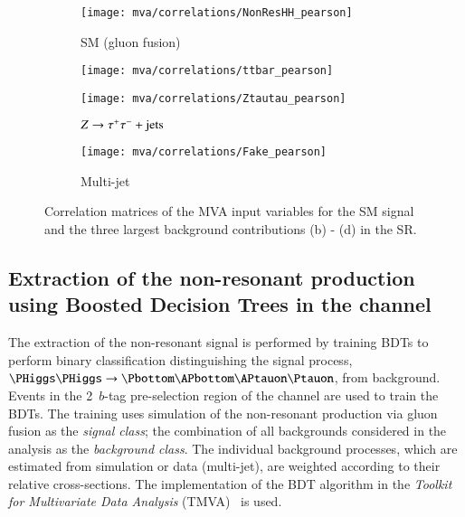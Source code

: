 \begin{figure}[htbp]
  \centering

  \begin{subfigure}[t]{.49\textwidth}
    \texttt{[image: mva/correlations/NonResHH\_pearson]}
    \caption{SM \HH (gluon fusion)}
  \end{subfigure}\hfill %
  \begin{subfigure}[t]{.49\textwidth}
    \texttt{[image: mva/correlations/ttbar\_pearson]}
    \caption{\ttbar}
  \end{subfigure}

  \begin{subfigure}[t]{.49\textwidth}
    \texttt{[image: mva/correlations/Ztautau\_pearson]}
    \caption{$Z \rightarrow \tau^{+} \tau^{-} + \text{jets}$}
  \end{subfigure}\hfill %
  \begin{subfigure}[t]{.49\textwidth}
    \texttt{[image: mva/correlations/Fake\_pearson]}
    \caption{Multi-jet}
  \end{subfigure}

  \caption{Correlation matrices of the MVA input variables for the SM
    \HH signal and the three largest background contributions (b) -
    (d) in the \hadhad SR.}
  \label{fig:mva_input_correlations}
\end{figure}


\subsection{Extraction of the non-resonant \HH production using
  Boosted Decision Trees in the \hadhad channel}
\label{sec:mva_smbdt}

The extraction of the non-resonant \HH signal is performed by training
BDTs to perform binary classification distinguishing the signal
process, $\HH \to \bbtautau$, from background. Events in the 2~$b$-tag
pre-selection region of the \hadhad channel are used to train the
BDTs. The training uses simulation of the non-resonant \HH production
via gluon fusion as the \emph{signal class}; the combination of all
backgrounds considered in the analysis as the \emph{background class}.
The individual background processes, which are estimated from
simulation or data (multi-jet), are weighted according to their
relative cross-sections. The implementation of the BDT algorithm in
the \emph{Toolkit for Multivariate Data Analysis}
(TMVA)~\cite{Hocker:2007ht} is used.


